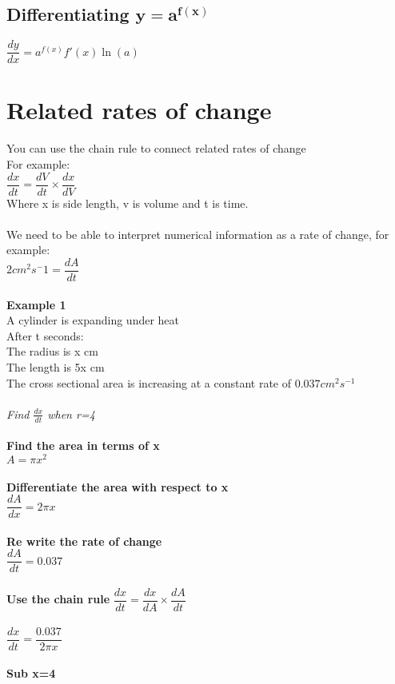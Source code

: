 \documentclass{article}[18pt]
\begin{document}
\subsection{Differentiating $\mathbf{y=a^{f(x)}}$}
$\dfrac{dy}{dx}=a^{f(x)}f'(x)\ln(a)$\\
\section{Related rates of change}
You can use the chain rule to connect related rates of change\\
For example:\\
$\dfrac{dx}{dt}=\dfrac{dV}{dt}\times\dfrac{dx}{dV}$\\
Where x is side length, v is volume and t is time.\\
\\
We need to be able to interpret numerical information as a rate of change, for example:\\
$2cm^2s^-1=\dfrac{dA}{dt}$\\
\\
\textbf{Example 1}\\
A cylinder is expanding under heat\\
After t seconds:\\
The radius is x cm\\
The length is 5x cm\\
The cross sectional area is increasing at a constant rate of $0.037cm^2s^{-1}$\\
\\
\textit{Find $\frac{dx}{dt}$ when r=4}\\
\\
\textbf{Find the area in terms of x}\\
$A=\pi x^2$\\
\\
\textbf{Differentiate the area with respect to x}\\
$\dfrac{dA}{dx}=2\pi x$\\
\\
\textbf{Re write the rate of change}\\
$\dfrac{dA}{dt}=0.037$\\
\\
\textbf{Use the chain rule}
$\dfrac{dx}{dt}=\dfrac{dx}{dA}\times\dfrac{dA}{dt}$\\
\\
$\dfrac{dx}{dt}=\dfrac{0.037}{2\pi x}$\\
\\
\textbf{Sub x=4}\\
\end{document}
